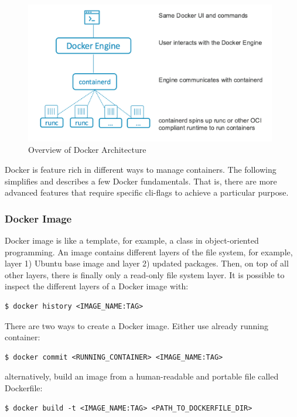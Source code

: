 \begin{figure}[h!]
    \centering
    \includegraphics[width=11cm]{figure/dockerarchblog}
    \caption{Overview of Docker Architecture~\cite{Docker1199:online}}
    \label{fig:arch}
\end{figure}

\skippara Docker is feature rich in different ways to manage containers.
The following simplifies and describes a few Docker fundamentals.
That is, there are more advanced features that require specific \gls{cli}-flags to achieve a particular purpose.

\subsubsection{Docker Image}
Docker image is like a template, for example, a class in object-oriented programming.
An image contains different layers of the file system, for example, layer 1) Ubuntu base image and layer 2) updated packages.
Then, on top of all other layers, there is finally only a read-only file system layer.
It is possible to inspect the different layers of a Docker image with:
\begin{lstlisting}[numbers=none, frame=single]
  $ docker history <IMAGE_NAME:TAG>
\end{lstlisting}

\skippara There are two ways to create a Docker image. Either use already running container:
\begin{lstlisting}[numbers=none, frame=single]
  $ docker commit <RUNNING_CONTAINER> <IMAGE_NAME:TAG>
\end{lstlisting}

\skippara alternatively, build an image from a human-readable and portable file called Dockerfile:
\begin{lstlisting}[numbers=none, frame=single]
  $ docker build -t <IMAGE_NAME:TAG> <PATH_TO_DOCKERFILE_DIR>
\end{lstlisting}


